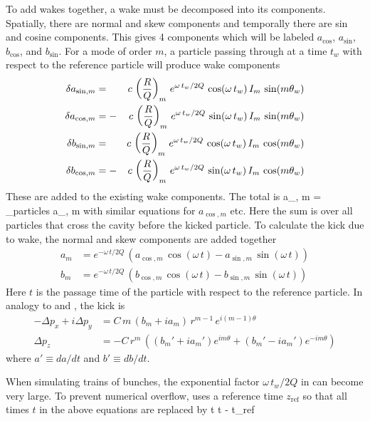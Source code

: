 To add wakes together, a wake must be decomposed into its
components.  Spatially, there are normal and skew components and
temporally there are sin and cosine components. This gives 4
components which will be labeled $a_{\cos}$, $a_{\sin}$, $b_{\cos}$,
and $b_{\sin}$. For a mode of order $m$, a particle passing through at
a time $t_w$ with respect to the reference particle will produce
wake components
\begin{alignat}{2}
  \delta a_{\sin, m} &=  &c \, \left( \frac{R}{Q} \right)_m \,
    e^{\omega \, t_w/ 2 Q} \, \cos (\omega \, t_w) \, I_m \, \sin(m \theta_w) 
    \nonumber \\
  \delta a_{\cos, m} &= -&c \, \left( \frac{R}{Q} \right)_m \,
    e^{\omega \, t_w/ 2 Q} \, \sin (\omega \, t_w) \, I_m \, \sin(m \theta_w) 
    \label{ac2rq} 
    \\
  \delta b_{\sin, m} &=  &c \, \left( \frac{R}{Q} \right)_m \,
    e^{\omega \, t_w/ 2 Q} \, \cos (\omega \, t_w) \, I_m \, \cos(m \theta_w) 
    \nonumber \\
  \delta b_{\cos, m} &= -&c \, \left( \frac{R}{Q} \right)_m \,
    e^{\omega \, t_w/ 2 Q} \, \sin (\omega \, t_w) \, I_m \, \cos(m \theta_w) 
    \nonumber
\end{alignat}
These are added to the existing wake components. The total is
\Begineq
  a_{\sin, m} = \sum_{\mbox{particles}} \delta a_{\sin, m}
\Endeq
with similar equations for $a_{\cos, m}$ etc. Here the sum is over all particles
that cross the cavity before the kicked particle. To calculate the kick
due to wake, the normal and skew components are added together
\begin{align}
  a_m &= e^{-\omega \, t/ 2 Q} \, \left( 
    a_{\cos, m} \, \cos (\omega \, t) - a_{\sin, m} \, \sin (\omega \, t) \right) 
    \label{akz2q} \\
  b_m &= e^{-\omega \, t/ 2 Q} \, \left(
    b_{\cos, m} \, \cos (\omega \, t) - b_{\sin, m} \, \sin (\omega \, t) \right) \nonumber 
\end{align}
Here $t$ is the passage time of the particle with respect to the
reference particle. In analogy to  and , the kick
is
\begin{align}
  -\Delta p_x + i\Delta p_y &= C \, 
    m \, (b_m + i a_m) \, r^{m-1} \, e^{i (m-1) \theta} 
    \label{ppcmbar} \\
  \Delta p_z &= -C \, r^m \, \left( 
    (b_m' + i a_m') e^{i m\theta} + (b_m' - i a_m') e^{-i m\theta} \right)
\end{align}
where $a' \equiv da/dt$ and $b' \equiv db/dt$.

When simulating trains of bunches, the exponential factor $\omega \, t_w / 2
Q$ in  can become very large. To prevent numerical overflow,
\bmad uses a reference time $z_{\mbox{ref}}$ so that all times
$t$ in the above equations are replaced by
\Begineq
  t \longrightarrow t - t_{\mbox{ref}}
\Endeq


